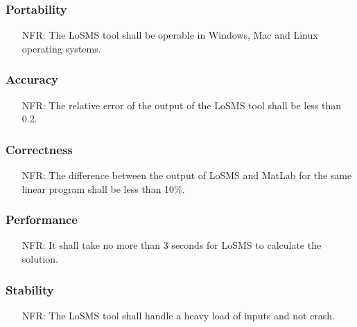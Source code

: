 \documentclass[12pt]{article}
\newcounter{reqnum} %
\newcounter{nfreqnum} %
\newcommand{\famname}{LoSMS} %
\begin{document}
\subsubsection*{Portability}

\begin{itemize}
	\item[NFR\refstepcounter{nfreqnum}\thenfreqnum \label{NFR_portability}:] 
	The 
	\famname{} tool shall be operable in Windows, Mac and Linux operating 
	systems.
\end{itemize}

\subsubsection*{Accuracy}

\begin{itemize}
	\item[NFR\refstepcounter{nfreqnum}\thenfreqnum \label{NFR_accuracy}:] The 
	relative error of the output of the \famname{} tool shall be less than 
	0.2. 
\end{itemize}

\subsubsection*{Correctness}

\begin{itemize}
	\item[NFR\refstepcounter{nfreqnum}\thenfreqnum \label{NFR_correctness}:] 
	The difference between the output of \famname{} and MatLab for the same 
	linear program shall be less than 10\%.
\end{itemize}

\subsubsection*{Performance}

\begin{itemize}
	\item[NFR\refstepcounter{nfreqnum}\thenfreqnum \label{NFR_performance}:] It 
	shall take no more than 3 seconds for \famname{} to calculate the solution.
\end{itemize}

\subsubsection*{Stability}

\begin{itemize}
	\item[NFR\refstepcounter{nfreqnum}\thenfreqnum \label{NFR_stability}:] The 
	\famname{} tool shall handle a heavy load of inputs and not crash.
\end{itemize}
\end{document}
